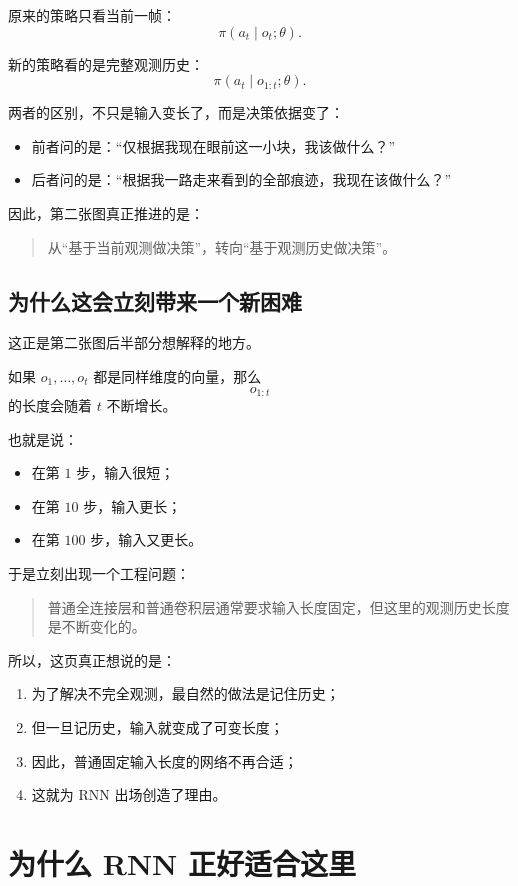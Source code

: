 \documentclass[12pt,a4paper]{ctexart}
\begin{document}
原来的策略只看当前一帧：
\[
\pi(a_t \mid o_t; \theta).
\]

新的策略看的是完整观测历史：
\[
\pi(a_t \mid o_{1:t}; \theta).
\]

两者的区别，不只是输入变长了，而是决策依据变了：
\begin{itemize}
  \item 前者问的是：“仅根据我现在眼前这一小块，我该做什么？”
  \item 后者问的是：“根据我一路走来看到的全部痕迹，我现在该做什么？”
\end{itemize}

因此，第二张图真正推进的是：
\begin{quote}
从“基于当前观测做决策”，转向“基于观测历史做决策”。
\end{quote}

\subsection{为什么这会立刻带来一个新困难}

这正是第二张图后半部分想解释的地方。

如果 \(o_1,\dots,o_t\) 都是同样维度的向量，那么
\[
o_{1:t}
\]
的长度会随着 \(t\) 不断增长。

也就是说：
\begin{itemize}
  \item 在第 \(1\) 步，输入很短；
  \item 在第 \(10\) 步，输入更长；
  \item 在第 \(100\) 步，输入又更长。
\end{itemize}

于是立刻出现一个工程问题：
\begin{quote}
普通全连接层和普通卷积层通常要求输入长度固定，但这里的观测历史长度是不断变化的。
\end{quote}

所以，这页真正想说的是：
\begin{enumerate}
  \item 为了解决不完全观测，最自然的做法是记住历史；
  \item 但一旦记历史，输入就变成了可变长度；
  \item 因此，普通固定输入长度的网络不再合适；
  \item 这就为 RNN 出场创造了理由。
\end{enumerate}

\section{为什么 RNN 正好适合这里}
\end{document}
